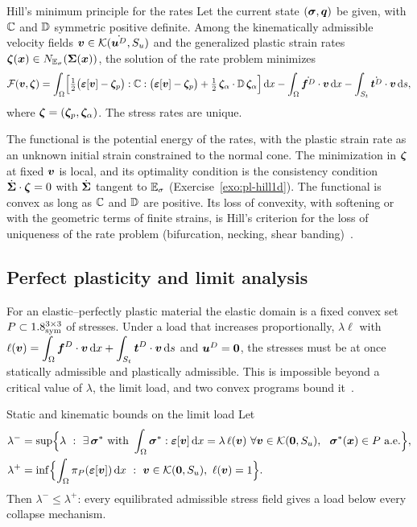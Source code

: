 \begin{gbox}{Hill's minimum principle for the rates}\label{thm:pl-hill}
Let the current state $(\bm{\sigma},\bm{q})$ be given, with $\mathbb{C}$ and $\mathbb{D}$ symmetric
positive definite. Among the kinematically admissible velocity fields
$\bm{v}\in\mathcal{K}(\dot{\bm{u}^{D}},S_u)$ and the generalized plastic strain rates
$\bm{\zeta}(\bm{x})\in N_{\mathbb{E}_{\sigma}}(\bm{\Sigma}(\bm{x}))$, the solution of the rate problem
minimizes
\[
  \mathcal F(\bm{v},\bm{\zeta})=\int_\Omega\Bigl[\tfrac12\bigl(\bm{\varepsilon}[\bm{v}]-\bm{\zeta}_p\bigr):\mathbb{C}:\bigl(\bm{\varepsilon}[\bm{v}]-\bm{\zeta}_p\bigr)
  +\tfrac12\,\bm{\zeta}_\alpha\cdot\mathbb{D}\,\bm{\zeta}_\alpha\Bigr]\,\mathrm{d} x
  -\int_\Omega\dot{\bm{f}^{D}}\cdot\bm{v}\,\mathrm{d} x-\int_{S_t}\dot{\bm{t}^{D}}\cdot\bm{v}\,\mathrm{d} s ,
\]
where $\bm{\zeta}=(\bm{\zeta}_p,\bm{\zeta}_\alpha)$. The stress rates are unique.
\end{gbox}
\noindent The functional is the potential energy of the rates, with the
plastic strain rate as an unknown initial strain constrained to the normal
cone. The minimization in $\bm{\zeta}$ at fixed $\bm{v}$ is local, and its
optimality condition is the consistency condition $\dot{\bm{\Sigma}}\cdot\bm{\zeta}=0$
with $\dot{\bm{\Sigma}}$ tangent to $\mathbb{E}_{\sigma}$ (Exercise~\ref{exo:pl-hill1d}). The
functional is convex as long as $\mathbb{C}$ and $\mathbb{D}$ are positive. Its loss of
convexity, with softening or with the geometric terms of finite strains, is
Hill's criterion for the loss of uniqueness of the rate problem (bifurcation,
necking, shear banding)~\cite{Hill1958,Nguyen2000}.

\subsection{Perfect plasticity and limit analysis}\label{ssec:pl-limit}
%
For an elastic--perfectly plastic material the elastic domain is a fixed
convex set $P\subset1.8^{3\times3}_{\mathrm{sym}}$ of stresses. Under a load that increases
proportionally, $\lambda\ell$ with $\ell(\bm{v})=\displaystyle\int_\Omega\bm{f}^{D}\cdot\bm{v}\,\mathrm{d} x+\int_{S_t}\bm{t}^{D}\cdot\bm{v}\,\mathrm{d} s$
and $\bm{u}^{D}=\bm{0}$, the stresses must be at once statically admissible and
plastically admissible. This is impossible beyond a critical value of
$\lambda$, the limit load, and two convex programs bound
it~\cite{Salencon2002,Temam1983}.

\begin{gbox}{Static and kinematic bounds on the limit load}\label{thm:pl-limit}
Let
\begin{align*}
  \lambda^-&=\sup\Bigl\{\lambda\ :\ \exists\,\sig^\ast\ \text{with }
  \int_\Omega\sig^\ast:\eps[\vv]\dd x=\lambda\,\ell(\vv)\ \forall\vv\in\Kad(\vzero,S_u),\ \
  \sig^\ast(\vx)\in P\ \text{a.e.}\Bigr\},\\
  \lambda^+&=\inf\Bigl\{\int_\Omega\pi_P(\eps[\vv])\dd x\ :\ \vv\in\Kad(\vzero,S_u),\ \ell(\vv)=1\Bigr\}.
\end{align*}
Then $\lambda^-\le\lambda^+$: every equilibrated admissible stress field
gives a load below every collapse mechanism.
\end{gbox}
